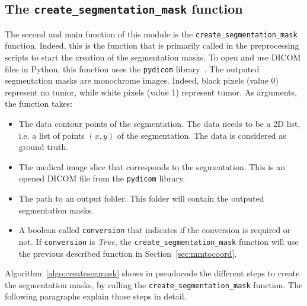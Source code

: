 \subsection{The \texttt{create\_segmentation\_mask} function}
The second and main function of this module is the \texttt{create\_segmentation\_mask} function. Indeed, this is the function that is primarily called in the preprocessing scripts to start the creation of the segmentation masks. To open and use DICOM files in Python, this function uses the \texttt{pydicom} library~\cite{mason_su-e-t-33_2011}. The outputed segmentation masks are monochrome images. Indeed, black pixels (value 0) represent no tumor, while white pixels (value 1) represent tumor. As arguments, the function takes:
\begin{itemize}
  \item The data contour points of the segmentation. The data needs to be a 2D list, i.e. a list of points $(x,y)$ of the segmentation. The data is considered as ground truth.
  \item The medical image slice that corresponds to the segmentation. This is an opened DICOM file from the \texttt{pydicom} library.
  \item The path to an output folder. This folder will contain the outputed segmentation masks.
  \item A boolean called \texttt{conversion} that indicates if the conversion is required or not. If \texttt{conversion} is \emph{True}, the \texttt{create\_segmentation\_mask} function will use the previous described function in Section~\ref{sec:mmtocoord}.
\end{itemize}
Algorithm~\ref{algo:createsegmask} shows in pseudocode the different steps to create the segmentation masks, by calling the \texttt{create\_segmentation\_mask} function. The following paragraphs explain those steps in detail.

